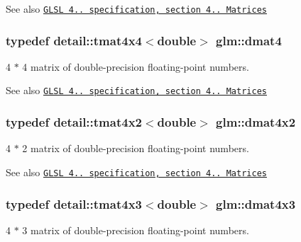 \begin{DoxySeeAlso}{\-See also}
\href{http://www.opengl.org/registry/doc/GLSLangSpec.4.20.8.pdf}{\tt \-G\-L\-S\-L 4.. specification, section 4.. \-Matrices} 
\end{DoxySeeAlso}
\hypertarget{group__core__types_ga68b5efb5d529f9031481ef36f9babd96}{
\subsubsection[{dmat4}]{\setlength{\rightskip}{0pt plus 5cm}typedef detail\-::tmat4x4$<$double$>$ {\bf glm\-::dmat4}}}\label{group__core__types_ga68b5efb5d529f9031481ef36f9babd96}
4 $\ast$ 4 matrix of double-\/precision floating-\/point numbers.

\begin{DoxySeeAlso}{\-See also}
\href{http://www.opengl.org/registry/doc/GLSLangSpec.4.20.8.pdf}{\tt \-G\-L\-S\-L 4.. specification, section 4.. \-Matrices} 
\end{DoxySeeAlso}
\hypertarget{group__core__types_gaec598e6dda8b2119877d992f5e0c1bae}{
\subsubsection[{dmat4x2}]{\setlength{\rightskip}{0pt plus 5cm}typedef detail\-::tmat4x2$<$double$>$ {\bf glm\-::dmat4x2}}}\label{group__core__types_gaec598e6dda8b2119877d992f5e0c1bae}
4 $\ast$ 2 matrix of double-\/precision floating-\/point numbers.

\begin{DoxySeeAlso}{\-See also}
\href{http://www.opengl.org/registry/doc/GLSLangSpec.4.20.8.pdf}{\tt \-G\-L\-S\-L 4.. specification, section 4.. \-Matrices} 
\end{DoxySeeAlso}
\hypertarget{group__core__types_ga47f7b642f84d1272a0dafa221c8fd720}{
\subsubsection[{dmat4x3}]{\setlength{\rightskip}{0pt plus 5cm}typedef detail\-::tmat4x3$<$double$>$ {\bf glm\-::dmat4x3}}}\label{group__core__types_ga47f7b642f84d1272a0dafa221c8fd720}
4 $\ast$ 3 matrix of double-\/precision floating-\/point numbers.


